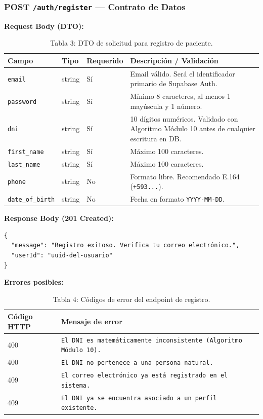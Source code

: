 \documentclass[a4paper,12pt]{article}
\renewcommand{\arraystretch}{1.1}
\begin{document}
\subsubsection{POST \texttt{/auth/register} — Contrato de Datos}

\textbf{Request Body (DTO):}
\begin{table}[H]
\centering
\small
\renewcommand{\arraystretch}{1.4}
\begin{tabularx}{\linewidth}{|l|l|l|X|}
\hline
\rowcolor{SKTLight}
\textbf{Campo} & \textbf{Tipo} & \textbf{Requerido} & \textbf{Descripción / Validación} \\
\hline
\texttt{email} & string & Sí & Email válido. Será el identificador primario de Supabase Auth. \\
\hline
\texttt{password} & string & Sí & Mínimo 8 caracteres, al menos 1 mayúscula y 1 número. \\
\hline
\texttt{dni} & string & Sí & 10 dígitos numéricos. Validado con Algoritmo Módulo 10 antes de cualquier escritura en DB. \\
\hline
\texttt{first\_name} & string & Sí & Máximo 100 caracteres. \\
\hline
\texttt{last\_name} & string & Sí & Máximo 100 caracteres. \\
\hline
\texttt{phone} & string & No & Formato libre. Recomendado E.164 (\texttt{+593...}). \\
\hline
\texttt{date\_of\_birth} & string & No & Fecha en formato \texttt{YYYY-MM-DD}. \\
\hline
\end{tabularx}
\caption*{Tabla 3: DTO de solicitud para registro de paciente.}
\end{table}

\textbf{Response Body (201 Created):}
\begin{verbatim}
{
  "message": "Registro exitoso. Verifica tu correo electrónico.",
  "userId": "uuid-del-usuario"
}
\end{verbatim}

\textbf{Errores posibles:}
\begin{table}[H]
\centering
\small
\renewcommand{\arraystretch}{1.4}
\begin{tabularx}{\linewidth}{|l|X|}
\hline
\rowcolor{SKTLight}
\textbf{Código HTTP} & \textbf{Mensaje de error} \\
\hline
400 & \texttt{El DNI es matemáticamente inconsistente (Algoritmo Módulo 10).} \\
\hline
400 & \texttt{El DNI no pertenece a una persona natural.} \\
\hline
409 & \texttt{El correo electrónico ya está registrado en el sistema.} \\
\hline
409 & \texttt{El DNI ya se encuentra asociado a un perfil existente.} \\
\hline
\end{tabularx}
\caption*{Tabla 4: Códigos de error del endpoint de registro.}
\end{table}
\end{document}
